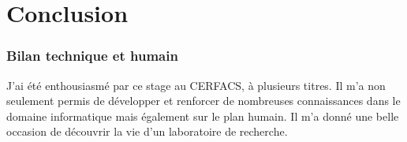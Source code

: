 \chapter*{Conclusion}
\vspace{-0.5cm}
\subsection*{Bilan technique et humain}

J’ai été enthousiasmé par ce stage au CERFACS, à plusieurs titres. Il m’a non seulement permis de développer et renforcer de nombreuses connaissances dans le domaine informatique mais également sur le plan humain. Il m’a donné une belle occasion de découvrir la vie d’un laboratoire de recherche.

